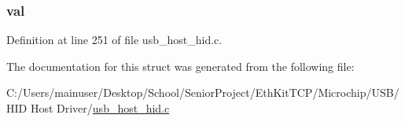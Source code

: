 \subsubsection[{val}]{ val}\label{struct___u_s_b___h_i_d___d_e_v_i_c_e___i_n_f_o_a5986ea8162aa0f6608b36b20964044dd}


Definition at line 251 of file usb\+\_\+host\+\_\+hid.\+c.



The documentation for this struct was generated from the following file\+:\begin{DoxyCompactItemize}
\item 
C\+:/\+Users/mainuser/\+Desktop/\+School/\+Senior\+Project/\+Eth\+Kit\+T\+C\+P/\+Microchip/\+U\+S\+B/\+H\+I\+D Host Driver/\hyperlink{usb__host__hid_8c}{usb\+\_\+host\+\_\+hid.\+c}\end{DoxyCompactItemize}
